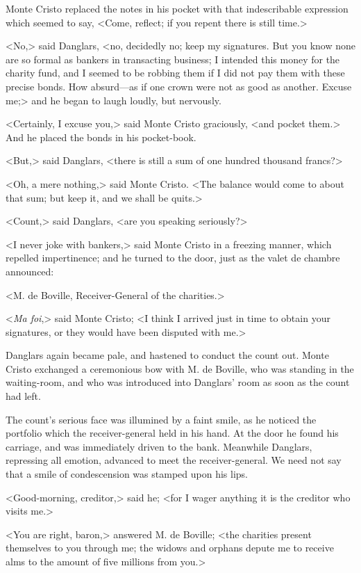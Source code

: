  Monte Cristo replaced the notes in his pocket with that indescribable expression which seemed to say, <Come, reflect; if you repent there is still time.> 

 <No,> said Danglars, <no, decidedly no; keep my signatures. But you know none are so formal as bankers in transacting business; I intended this money for the charity fund, and I seemed to be robbing them if I did not pay them with these precise bonds. How absurd—as if one crown were not as good as another. Excuse me;> and he began to laugh loudly, but nervously. 

 <Certainly, I excuse you,> said Monte Cristo graciously, <and pocket them.> And he placed the bonds in his pocket-book. 

 <But,> said Danglars, <there is still a sum of one hundred thousand francs?> 

 <Oh, a mere nothing,> said Monte Cristo. <The balance would come to about that sum; but keep it, and we shall be quits.> 

 <Count,> said Danglars, <are you speaking seriously?> 

 <I never joke with bankers,> said Monte Cristo in a freezing manner, which repelled impertinence; and he turned to the door, just as the valet de chambre announced: 

 <M. de Boville, Receiver-General of the charities.> 

 <\textit{Ma foi},> said Monte Cristo; <I think I arrived just in time to obtain your signatures, or they would have been disputed with me.> 

 Danglars again became pale, and hastened to conduct the count out. Monte Cristo exchanged a ceremonious bow with M. de Boville, who was standing in the waiting-room, and who was introduced into Danglars' room as soon as the count had left. 

 The count's serious face was illumined by a faint smile, as he noticed the portfolio which the receiver-general held in his hand. At the door he found his carriage, and was immediately driven to the bank. Meanwhile Danglars, repressing all emotion, advanced to meet the receiver-general. We need not say that a smile of condescension was stamped upon his lips. 

 <Good-morning, creditor,> said he; <for I wager anything it is the creditor who visits me.> 

 <You are right, baron,> answered M. de Boville; <the charities present themselves to you through me; the widows and orphans depute me to receive alms to the amount of five millions from you.> 

